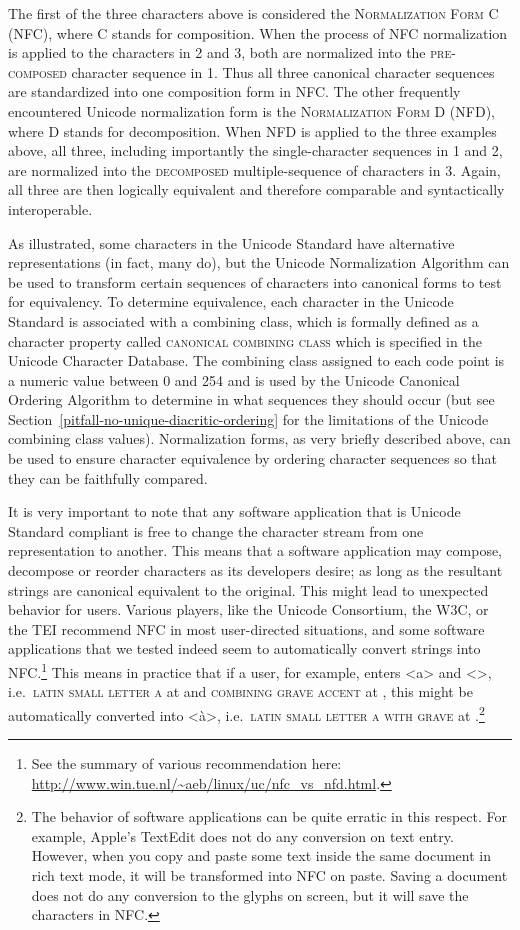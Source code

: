The first of the three characters above is considered the \textsc{Normalization
Form C (NFC)}, where \textsc{C} stands for composition. When the process of NFC
normalization is applied to the characters in 2 and 3, both 
are normalized into the \textsc{pre-composed} character sequence in 1. Thus all
three canonical character sequences are standardized into one composition form
in NFC. The other frequently encountered Unicode normalization form is the
\textsc{Normalization Form D (NFD)}, where \textsc{D} stands for decomposition.
When NFD is applied to the three examples above, all three, including
importantly the single-character sequences in 1 and 2, are normalized into the
\textsc{decomposed} multiple-sequence of characters in 3. Again, all three are
then logically equivalent and therefore comparable and syntactically
interoperable.

As illustrated, some characters in the Unicode Standard have alternative
representations (in fact, many do), but the Unicode Normalization Algorithm can
be used to transform certain sequences of characters into canonical
forms to test for equivalency. To determine equivalence, each
character in the Unicode Standard is associated with a combining class, which is
formally defined as a character property called \textsc{canonical combining
class} which is specified in the Unicode Character Database. The combining class
assigned to each code point is a numeric value between 0 and 254 and is used by
the Unicode Canonical Ordering Algorithm to determine in what sequences they should 
occur (but see Section~\ref{pitfall-no-unique-diacritic-ordering} for the limitations 
of the Unicode combining class values). Normalization forms, as very briefly
described above, can be used to ensure character equivalence by ordering
character sequences so that they can be faithfully compared.

It is very important to note that any software application that is Unicode
Standard compliant is free to change the character stream from one
representation to another. This means that a software application may compose,
decompose or reorder characters as its developers desire; as long as the
resultant strings are canonical equivalent to the original. This might lead to
unexpected behavior for users. Various players, like the Unicode Consortium, the
W{\large 3}C, or the TEI recommend NFC in most user-directed situations, and
some software applications that we tested indeed seem to automatically convert
strings into NFC.\footnote{See the summary of various recommendation here:
\url{http://www.win.tue.nl/~aeb/linux/uc/nfc_vs_nfd.html}.} This means in
practice that if a user, for example, enters <a> and <>, i.e.~\textsc{latin
small letter a} at  and \textsc{combining grave accent} at ,
this might be automatically converted into <à>, i.e.~\textsc{latin small letter
a with grave} at .\footnote{The behavior of software applications can
be quite erratic in this respect. For example, Apple's TextEdit does not do any
conversion on text entry. However, when you copy and paste some text inside the
same document in rich text mode, it will be transformed into
NFC on paste. Saving a document does not do any conversion to the glyphs on
screen, but it will save the characters in NFC.}


